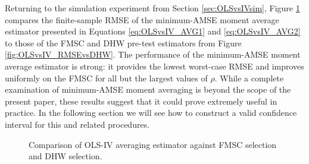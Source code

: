 Returning to the simulation experiment from Section \ref{sec:OLSvsIVsim}, Figure \ref{fig:OLSvsIV_AVG} compares the finite-sample RMSE of the minimum-AMSE moment average estimator presented in Equations \ref{eq:OLSvsIV_AVG1} and \ref{eq:OLSvsIV_AVG2} to those of the FMSC and DHW pre-test estimators from Figure \ref{fig:OLSvsIV_RMSEvsDHW}.
The performance of the minimum-AMSE moment average estimator is strong: it provides the lowest worst-case RMSE and improves uniformly on the FMSC for all but the largest values of $\rho$.
While a complete examination of minimum-AMSE moment averaging is beyond the scope of the present paper, these results suggest that it could prove extremely useful in practice.
In the following section we will see how to construct a valid confidence interval for this and related procedures.
\begin{figure}
\centering
	
	\caption{Comparison of OLS-IV averaging estimator against FMSC selection and DHW selection.}
	\label{fig:OLSvsIV_AVG}
\end{figure}